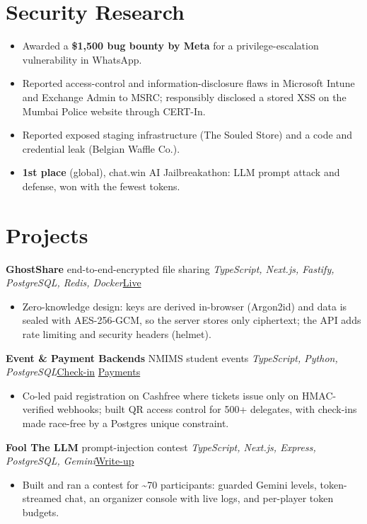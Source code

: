\documentclass[10pt, a4paper]{article}
\newcommand{\proj}[4]{\par\vspace{2.5pt}\textbf{#1} \textbar{} #2 \textbar{} \textit{\small #3}\hfill{\small #4}\par}
\newcommand{\lnk}[2]{\href{#1}{\color{linkc}#2}}
\begin{document}
\section{Security Research}
\begin{itemize}
  \item Awarded a \textbf{\$1,500 bug bounty by Meta} for a privilege-escalation vulnerability in WhatsApp.
  \item Reported access-control and information-disclosure flaws in Microsoft Intune and Exchange Admin to MSRC;
  responsibly disclosed a stored XSS on the Mumbai Police website through CERT-In.
  \item Reported exposed staging infrastructure (The Souled Store) and a code and credential leak (Belgian Waffle Co.).
  \item \textbf{1st place} (global), chat.win AI Jailbreakathon: LLM prompt attack and defense, won with the fewest tokens.
\end{itemize}

\section{Projects}
\proj{GhostShare}{end-to-end-encrypted file sharing}{TypeScript, Next.js, Fastify, PostgreSQL, Redis, Docker}{\lnk{https://share.jkartik.in}{Live}}
\begin{itemize}
  \item Zero-knowledge design: keys are derived in-browser (Argon2id) and data is sealed with AES-256-GCM, so the server
  stores only ciphertext; the API adds rate limiting and security headers (helmet).
\end{itemize}
\proj{Event \& Payment Backends}{NMIMS student events}{TypeScript, Python, PostgreSQL}{\lnk{https://github.com/Social-Conclave/conc-qr}{Check-in}\,\textbar\,\lnk{https://github.com/MPSTME-ACM/pfe-regi}{Payments}}
\begin{itemize}
  \item Co-led paid registration on Cashfree where tickets issue only on HMAC-verified webhooks; built QR access control for
  500+ delegates, with check-ins made race-free by a Postgres unique constraint.
\end{itemize}
\proj{Fool The LLM}{prompt-injection contest}{TypeScript, Next.js, Express, PostgreSQL, Gemini}{\lnk{https://jkartik.in/blog/where-llm-guardrails-break/}{Write-up}}
\begin{itemize}
  \item Built and ran a contest for \textasciitilde{}70 participants: guarded Gemini levels, token-streamed chat, an organizer console with
  live logs, and per-player token budgets.
\end{itemize}
\end{document}
